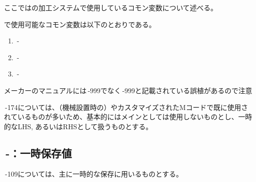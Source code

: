 

ここでは\DMC の加工システムで使用しているコモン変数について述べる。


\DMC で使用可能なコモン変数は以下のとおりである。
\begin{enumerate}[label=\sarrow]
\item {}\,-
\item {}\,-
\item {}\,-
\end{enumerate}
\begin{marker}
メーカーのマニュアルには\,-\ttNum999でなく\,-\ttNum999と記載されている誤植があるので注意
\end{marker}



\,-\ttNum174については、（機械設置時の）\bundledNCPrg やカスタマイズされたMコードで既に使用されているものが多いため、基本的にはメインとしては使用しないものとし、一時的なLHS, あるいはRHSとして扱うものとする。


\subsection{\,-：一時保存値}
\noindent{}\,-\ttNum109については、主に一時的な保存に用いるものとする。\\

